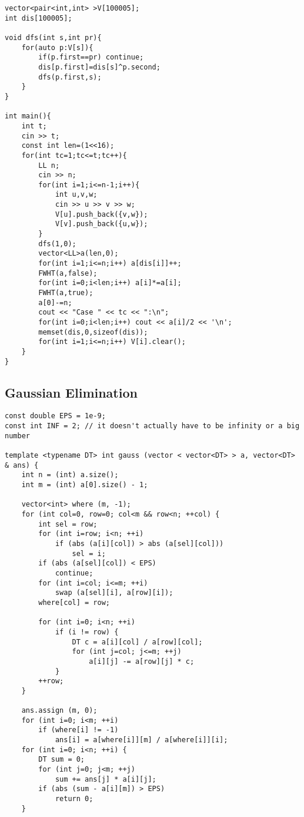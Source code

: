 \documentclass[10pt,a4paper,onesided]{article}
\begin{document}
\begin{multicols*}{3}
\begin{lstlisting}
vector<pair<int,int> >V[100005];
int dis[100005];

void dfs(int s,int pr){
    for(auto p:V[s]){
        if(p.first==pr) continue;
        dis[p.first]=dis[s]^p.second;
        dfs(p.first,s);
    }
}

int main(){
    int t;
    cin >> t;
    const int len=(1<<16);
    for(int tc=1;tc<=t;tc++){
        LL n;
        cin >> n;
        for(int i=1;i<=n-1;i++){
            int u,v,w;
            cin >> u >> v >> w;
            V[u].push_back({v,w});
            V[v].push_back({u,w});
        }
        dfs(1,0);
        vector<LL>a(len,0);
        for(int i=1;i<=n;i++) a[dis[i]]++;
        FWHT(a,false);
        for(int i=0;i<len;i++) a[i]*=a[i];
        FWHT(a,true);
        a[0]-=n;
        cout << "Case " << tc << ":\n";
        for(int i=0;i<len;i++) cout << a[i]/2 << '\n';
        memset(dis,0,sizeof(dis));
        for(int i=1;i<=n;i++) V[i].clear();
    }
}
\end{lstlisting}
\subsection{Gaussian Elimination}
\begin{lstlisting}
const double EPS = 1e-9;
const int INF = 2; // it doesn't actually have to be infinity or a big number

template <typename DT> int gauss (vector < vector<DT> > a, vector<DT> & ans) {
    int n = (int) a.size();
    int m = (int) a[0].size() - 1;

    vector<int> where (m, -1);
    for (int col=0, row=0; col<m && row<n; ++col) {
        int sel = row;
        for (int i=row; i<n; ++i)
            if (abs (a[i][col]) > abs (a[sel][col]))
                sel = i;
        if (abs (a[sel][col]) < EPS)
            continue;
        for (int i=col; i<=m; ++i)
            swap (a[sel][i], a[row][i]);
        where[col] = row;

        for (int i=0; i<n; ++i)
            if (i != row) {
                DT c = a[i][col] / a[row][col];
                for (int j=col; j<=m; ++j)
                    a[i][j] -= a[row][j] * c;
            }
        ++row;
    }

    ans.assign (m, 0);
    for (int i=0; i<m; ++i)
        if (where[i] != -1)
            ans[i] = a[where[i]][m] / a[where[i]][i];
    for (int i=0; i<n; ++i) {
        DT sum = 0;
        for (int j=0; j<m; ++j)
            sum += ans[j] * a[i][j];
        if (abs (sum - a[i][m]) > EPS)
            return 0;
    }


\end{lstlisting}
\end{multicols*}
\end{document}
